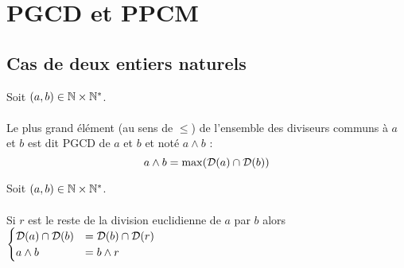 \section{PGCD et PPCM}
\subsection{Cas de deux entiers naturels}
\begin{defi}
	Soit \((a, b) \in \mathbb{N} \times \mathbb{N}^*\).\\~\\
	Le plus grand élément (au sens de \(\leq\)) de l’ensemble des diviseurs communs à \(a\) et \(b\) est dit PGCD de \(a\) et \(b\) et noté \(a \wedge b\) :
	\[a \wedge b = \max (\mathcal{D}(a) \cap \mathcal{D}(b))\]
\end{defi}

\begin{prop}

	Soit \((a, b) \in \mathbb{N} \times \mathbb{N}^*\).\\~\\
	Si \(r\) est le reste de la division euclidienne de \(a\) par \(b\) alors \(\begin{cases}
		\mathcal{D}(a) \cap \mathcal{D}(b) & = \mathcal{D}(b) \cap \mathcal{D}(r) \\
		a\wedge b                            & = b\wedge r
	\end{cases}\)
\end{prop}

